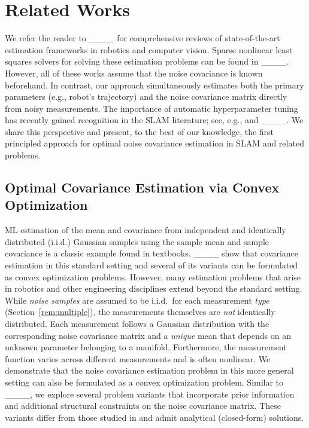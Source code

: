 \section{Related Works}
\label{sec:related}
We refer the reader to
____
for comprehensive reviews of state-of-the-art estimation frameworks in robotics
and computer vision. Sparse nonlinear least squares solvers for
solving these estimation problems can
be found in ____.
However, all of these works assume that the noise covariance is known
beforehand. In contrast, our approach simultaneously estimates both the primary
parameters (e.g., robot's trajectory) and the noise covariance matrix
directly from noisy measurements.
The importance of automatic hyperparameter tuning has recently gained
recognition in the SLAM literature; see, e.g., \cite[Section V]{ebadi2023present}
and ____. We share this perspective and
present, to the best of our knowledge, the first principled
approach for optimal noise covariance estimation in SLAM and related
problems.


\subsection{Optimal Covariance Estimation via Convex Optimization}
ML estimation of the mean and covariance from independent and identically
distributed (i.i.d.) Gaussian samples using the sample mean and sample
covariance is a classic example found in textbooks.
____ show that covariance
estimation in this standard setting and several of its variants can be formulated as convex optimization
problems.
However, many estimation problems that arise in robotics and other engineering disciplines extend
beyond the standard setting.
While \emph{noise samples} are assumed to be i.i.d.\ for each
measurement \emph{type} (Section~\ref{rem:multiple}), the measurements
themselves are \emph{not} identically distributed. Each measurement follows a Gaussian
distribution with the corresponding noise covariance matrix and a \emph{unique} mean that depends on an
unknown parameter belonging to a manifold.
Furthermore, the measurement function varies across different measurements and
is often nonlinear. 
We demonstrate that the noise covariance estimation problem in this
more general setting can also be formulated as a convex optimization problem. Similar to
____, we explore several problem variants that incorporate
prior information and additional structural constraints on the noise covariance
matrix. These variants differ from those studied in
\cite[Chapter 7.1.1]{boyd2004convex} and admit analytical (closed-form)
solutions.

